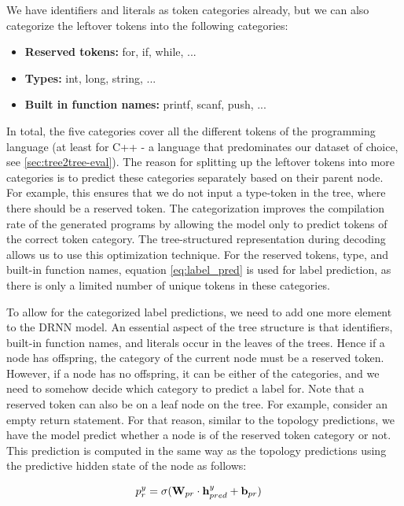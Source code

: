 We have identifiers and literals as token categories already, but we can also categorize the leftover tokens into the following categories:

\begin{itemize}
    \item \textbf{Reserved tokens:} for, if, while, ...
    \item \textbf{Types:} int, long, string, ...
    \item \textbf{Built in function names:} printf, scanf, push, ...
\end{itemize}



In total, the five categories cover all the different tokens of the programming language (at least for C++ - a language that predominates our dataset of choice, see \ref{sec:tree2tree-eval}). The reason for splitting up the leftover tokens into more categories is to predict these categories separately based on their parent node. For example, this ensures that we do not input a type-token in the tree, where there should be a reserved token. The categorization improves the compilation rate of the generated programs by allowing the model only to predict tokens of the correct token category. The tree-structured representation during decoding allows us to use this optimization technique. For the reserved tokens, type, and built-in function names, equation \ref{eq:label_pred} is used for label prediction, as there is only a limited number of unique tokens in these categories. 



To allow for the categorized label predictions, we need to add one more element to the DRNN model. 
An essential aspect of the tree structure is that identifiers, built-in function names, and literals occur in the leaves of the trees. 
Hence if a node has offspring, the category of the current node must be a reserved token. 
However, if a node has no offspring, it can be either of the categories, and we need to somehow decide which category to predict a label for. Note that a reserved token can also be on a leaf node on the tree. For example, consider an empty return statement. For that reason, similar to the topology predictions, we have the model predict whether a node is of the reserved token category or not. This prediction  is computed in the same way as the topology predictions using the predictive hidden state of the node as follows: 

\begin{align}
    p_r^y &= \sigma(\mathbf{W}_{pr} \cdot \mathbf{h}_{pred}^y + \mathbf{b}_{pr}) \label{eq:res_pred}
\end{align}



